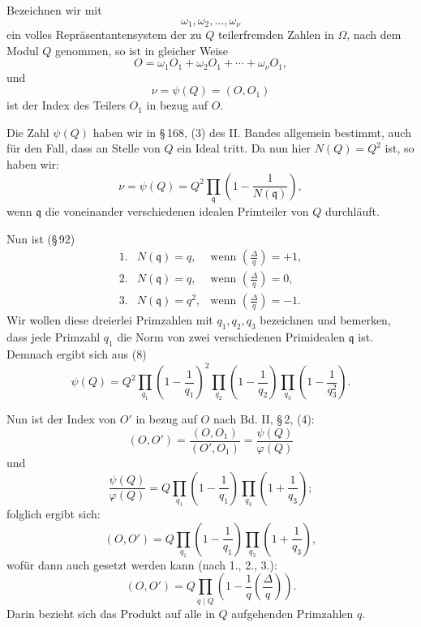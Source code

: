 \documentclass[11pt]{article}
\newcommand{\Jac}[2]{\left(\frac{#1}{#2}\right)}
\begin{document}
Bezeichnen wir mit
\[
 \omega_1,\omega_2,\ldots,\omega_\nu
\]
ein volles Repräsentantensystem der zu $Q$ teilerfremden Zahlen in $\Omega$, nach dem Modul $Q$ genommen, so ist in gleicher Weise
\begin{equation}
 O=\omega_1O_1+\omega_2O_1+\cdots+\omega_\nu O_1,
\tag{6}
\end{equation}
und
\begin{equation}
 \nu=\psi(Q)=(O,O_1)
\tag{7}
\end{equation}
ist der Index des Teilers $O_1$ in bezug auf $O$.

Die Zahl $\psi(Q)$ haben wir in \S\,168, (3) des II. Bandes allgemein bestimmt, auch für den Fall, dass an Stelle von $Q$ ein Ideal tritt. Da nun hier $N(Q)=Q^2$ ist, so haben wir:
\begin{equation}
 \nu=\psi(Q)=Q^2\prod_{\mathfrak q}\left(1-\frac1{N(\mathfrak q)}\right),
\tag{8}
\end{equation}
wenn $\mathfrak q$ die voneinander verschiedenen idealen Primteiler von $Q$ durchläuft.

Nun ist (\S\,92)
\[
\begin{array}{lll}
1.& N(\mathfrak q)=q,   & \text{wenn } \Jac{\Delta}{q}=+1,\\
2.& N(\mathfrak q)=q,   & \text{wenn } \Jac{\Delta}{q}=0,\\
3.& N(\mathfrak q)=q^2, & \text{wenn } \Jac{\Delta}{q}=-1.
\end{array}
\]
Wir wollen diese dreierlei Primzahlen mit $q_1,q_2,q_3$ bezeichnen und bemerken, dass jede Primzahl $q_1$ die Norm von zwei verschiedenen Primidealen $\mathfrak q$ ist. Demnach ergibt sich aus (8)
\begin{equation}
 \psi(Q)
 =Q^2
  \prod_{q_1}\left(1-\frac1{q_1}\right)^2
  \prod_{q_2}\left(1-\frac1{q_2}\right)
  \prod_{q_3}\left(1-\frac1{q_3^2}\right).
\tag{9}
\end{equation}

Nun ist der Index von $O'$ in bezug auf $O$ nach Bd. II, \S\,2, (4):
\[
 (O,O')=\frac{(O,O_1)}{(O',O_1)}=\frac{\psi(Q)}{\varphi(Q)}
\]
und
\[
 \frac{\psi(Q)}{\varphi(Q)}
 =Q\prod_{q_1}\left(1-\frac1{q_1}\right)
    \prod_{q_3}\left(1+\frac1{q_3}\right);
\]
folglich ergibt sich:
\[
 (O,O')
 =Q\prod_{q_1}\left(1-\frac1{q_1}\right)
    \prod_{q_3}\left(1+\frac1{q_3}\right),
\]
wofür dann auch gesetzt werden kann (nach 1., 2., 3.):
\begin{equation}
 (O,O')=
 Q\prod_{q\mid Q}\left(1-\frac1q\Jac{\Delta}{q}\right).
\tag{10}
\end{equation}
Darin bezieht sich das Produkt auf alle in $Q$ aufgehenden Primzahlen $q$.
\end{document}
